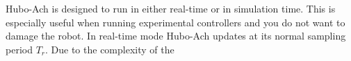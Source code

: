 



Hubo-Ach is designed to run in either real-time or in simulation time.
This is especially useful when running experimental controllers and you do not want to damage the robot.
In real-time mode Hubo-Ach updates at its normal sampling period $T_{r}$.
Due to the complexity of the 
